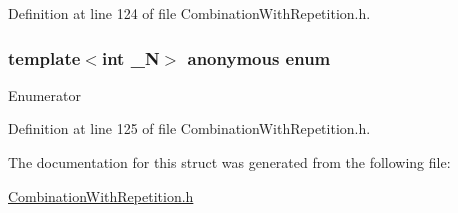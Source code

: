 Definition at line 124 of file Combination\+With\+Repetition.\+h.

\hypertarget{structmodel_1_1_combination_with_repetition_3_01___n_00_010_01_4_ac784a3fc45a4eec8ac24591668258a4b}{}\subsubsection[{anonymous enum}]{\setlength{\rightskip}{0pt plus 5cm}template$<$int \+\_\+\+N$>$ anonymous enum}\label{structmodel_1_1_combination_with_repetition_3_01___n_00_010_01_4_ac784a3fc45a4eec8ac24591668258a4b}
\begin{Desc}
\item[Enumerator]\par
\begin{description}
\item[{\em 
\hypertarget{structmodel_1_1_combination_with_repetition_3_01___n_00_010_01_4_ac784a3fc45a4eec8ac24591668258a4ba281a0a9bd8f045f76a3bde5b2c89fe57}{}value\label{structmodel_1_1_combination_with_repetition_3_01___n_00_010_01_4_ac784a3fc45a4eec8ac24591668258a4ba281a0a9bd8f045f76a3bde5b2c89fe57}
}]\end{description}
\end{Desc}


Definition at line 125 of file Combination\+With\+Repetition.\+h.



The documentation for this struct was generated from the following file\+:\begin{DoxyCompactItemize}
\item 
\hyperlink{_combination_with_repetition_8h}{Combination\+With\+Repetition.\+h}\end{DoxyCompactItemize}
